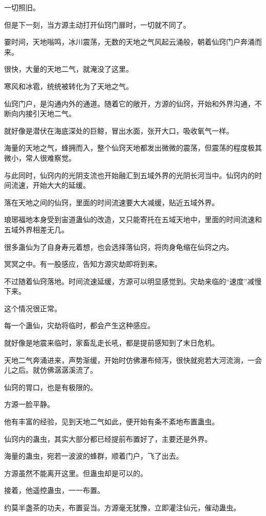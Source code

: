 \begin{this_body}
一切照旧。

但是下一刻，当方源主动打开仙窍门扉时，一切就不同了。

霎时间，天地嗡鸣，冰川震荡，无数的天地之气风起云涌般，朝着仙窍门户奔涌而来。

很快，大量的天地二气，就淹没了这里。

寒风和冰雹，统统被转化为了天地之气。

仙窍门户，是沟通内外的通道。随着它的敞开，方源的仙窍，开始和外界沟通，不断向内接引天地二气。

就好像是潜伏在海底深处的巨鲸，冒出水面，张开大口，吸收氧气一样。

海量的天地之气，蜂拥而入，整个仙窍天地都发出微微的震荡，但震荡的程度极其微小，常人很难察觉。

与此同时，仙窍内的光阴支流也开始融汇到五域外界的光阴长河当中。仙窍内的时间流速，开始大大的延缓。

落在天地之间的仙窍，里面的时间流速要大大减缓，贴近五域外界。

琅琊福地本身受到宙道蛊仙的改造，又只能寄托在五域天地中，里面的时间流速和五域外界相差无几。

很多蛊仙为了自身寿元着想，也会选择落仙窍，将肉身龟缩在仙窍之内。

冥冥之中。有一股感应，告知方源灾劫即将到来。

不过随着仙窍落地。时间流速延缓，方源可以明显感觉到。灾劫来临的“速度”减慢下来。

这个情况很正常。

每一个蛊仙，灾劫将临时，都会产生这种感应。

就好像是地震来临时，家畜乱走长吼，都是提前感知到了末日危机。

天地二气奔涌进来，声势渐缓，开始时仿佛瀑布倾泻，很快就宛若大河流淌，一会儿之后。就仿佛潺潺溪流了。

仙窍的胃口，也是有极限的。

方源一脸平静。

他有丰富的经验，见到天地二气如此，便开始有条不紊地布置蛊虫。

仙窍内的蛊虫，其实大部分都已经提前布置好了，主要还是外界。

海量的蛊虫，宛若一波波的蜂群，顺着门户，飞了出去。

方源虽然不能离开这里。但蛊虫却是可以的。

接着，他遥控蛊虫，一一布置。

约莫半盏茶的功夫，布置妥当。方源毫无犹豫，立即灌注仙元，催动蛊虫。


\end{this_body}
